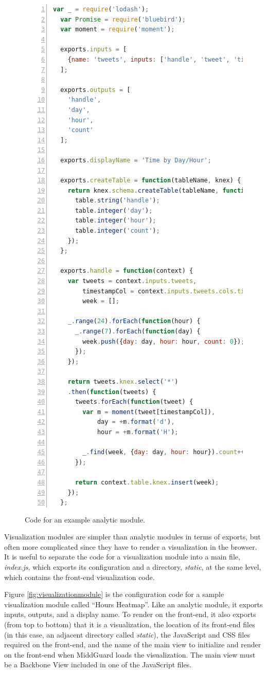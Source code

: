\documentclass[midd]{thesis}
\begin{document}
\begin{figure}[!ht]
  \centering
  \begin{lstlisting}[numbers=left,
                     numberstyle=\footnotesize,
                     numbersep=5pt,
                     language=javascript,
                     gobble=2]
  var _ = require('lodash');
  var Promise = require('bluebird');
  var moment = require('moment');

  exports.inputs = [
    {name: 'tweets', inputs: ['handle', 'tweet', 'timestamp']}
  ];

  exports.outputs = [
    'handle',
    'day',
    'hour',
    'count'
  ];

  exports.displayName = 'Time by Day/Hour';

  exports.createTable = function(tableName, knex) {
    return knex.schema.createTable(tableName, function(table) {
      table.string('handle');
      table.integer('day');
      table.integer('hour');
      table.integer('count');
    });
  };

  exports.handle = function(context) {
    var tweets = context.inputs.tweets,
        timestampCol = context.inputs.tweets.cols.timestamp,
        week = [];

    _.range(24).forEach(function(hour) {
      _.range(7).forEach(function(day) {
        week.push({day: day, hour: hour, count: 0});
      });
    });

    return tweets.knex.select('*')
    .then(function(tweets) {
      tweets.forEach(function(tweet) {
        var m = moment(tweet[timestampCol]),
            day = +m.format('d'),
            hour = +m.format('H');

        _.find(week, {day: day, hour: hour}).count++;
      });

      return context.table.knex.insert(week);
    });
  };
  \end{lstlisting}

  \caption{Code for an example analytic module.}
  \label{fig:analyticmodule}
\end{figure}

Visualization modules are simpler than analytic modules in terms of exports, but
often more complicated since they have to render a visualization in the browser.
It is useful to separate the code for a visualization module into a main file,
\textit{index.js}, which exports its configuration and a directory,
\textit{static}, at the same level, which contains the front-end visualization
code.

Figure \ref{fig:visualizationmodule} is the configuration code for a sample
visualization module called ``Hours Heatmap''. Like an analytic module, it
exports inputs, outputs, and a display name. To render on the front-end, it also
exports (from top to bottom) that it is a visualization, the location of its
front-end files (in this case, an adjacent directory called \textit{static}),
the JavaScript and CSS files required on the front-end, and the name of the main
view to initialize and render on the front-end when MiddGuard loads the
visualization. The main view must be a Backbone View included in one of the
JavaScript files.
\end{document}
